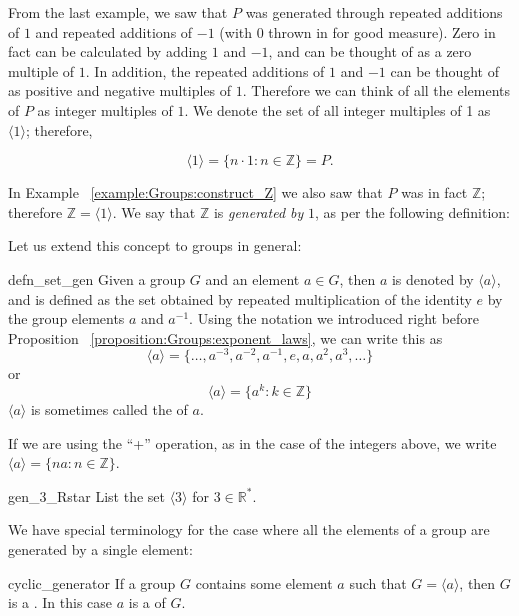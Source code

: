 \noindent
From the last example, we saw that $P$ was generated through repeated additions of $1$ and  repeated additions of $-1$ (with $0$ thrown in for good measure).  
Zero in fact can be calculated by adding $1$ and $-1$, and can be thought of as a zero multiple of $1$.  In addition,  the repeated additions of $1$ and $-1$ can be thought of 
as positive and negative multiples of $1$.  Therefore we can think of all the elements of $P$ as integer multiples of $1$.  We denote the set of all integer multiples of 1 as $\langle 1 \rangle$; therefore, 

\[ \langle 1 \rangle = \{ n \cdot 1 : n \in \mathbb Z \} = P. \]

\noindent
In Example ~\ref{example:Groups:construct_Z} we also saw that $P$ was in fact $\mathbb Z$; therefore $\mathbb Z = \langle 1 \rangle$. We say that $\mathbb Z$ is \emph{generated by} $1$, as per the following definition:

Let us extend this concept to groups in general:

\begin{defn}{defn_set_gen} Given a group $G$ and an element $a \in G$, then  $a$ is denoted by $\langle a \rangle$, and is defined as the set obtained by repeated multiplication of the identity $e$ by the group elements $a$ and $a^{-1}$.  Using the notation we introduced right before Proposition ~\ref{proposition:Groups:exponent_laws}, we can write this as
\[ \langle a \rangle = \{ \ldots, a^{-3}, a^{-2}, a^{-1}, e, a, a^2, a^3, \ldots \} \]
\noindent
or
\[ \langle a \rangle = \{ a^{k} : k \in \mathbb Z \} \]
$\langle a \rangle$ is sometimes called the  of $a$.
\end{defn}
\begin{rem}\label{rem_orbits}
If we are using the ``+'' operation, as in the case of the integers above, we write $\langle a \rangle  = \{ na : n \in {\mathbb Z} \}$.
\end{rem}

\begin{exercise}{gen_3_Rstar}
List the set $\langle 3 \rangle$ for $3 \in {\mathbb R}^*$.
\end{exercise}

\noindent
We have special terminology for the case where all the elements of a group are generated by a single element:

\begin{defn}{cyclic_generator}
 If a group $G$ contains some element $a$ such that $G = \langle a \rangle $, then $G$ is a
. In this case $a$ is a  of $G$.
\end{defn}

